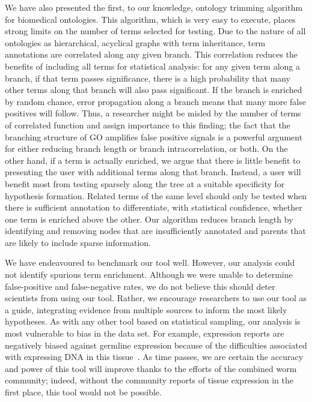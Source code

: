 \documentclass{bmcart}
\begin{document}
We have also presented the first, to our knowledge, ontology trimming algorithm for biomedical ontologies. This algorithm, which is very easy to execute, places strong limits on the number of terms selected for testing. Due to the nature of all ontologies as hierarchical, acyclical graphs with term inheritance, term annotations are correlated along any given branch. This correlation reduces the benefits of including all terms for statistical analysis: for any given term along a branch, if that term passes significance, there is a high probability that many other terms along that branch will also pass significant. If the branch is enriched by random chance, error propagation along a branch means that many more false positives will follow. Thus, a researcher might be misled by the number of terms of correlated function and assign importance to this finding; the fact that the branching structure of GO amplifies false positive signals is a powerful argument for either reducing branch length or branch intracorrelation, or both. On the other hand, if a term is actually enriched, we argue that there is little benefit to presenting the user with additional terms along that branch. Instead, a user will benefit most from testing sparsely along the tree at a suitable specificity for hypothesis formation. Related terms of the same level should only be tested when there is sufficient annotation to differentiate, with statistical confidence, whether one term is enriched above the other. Our algorithm reduces branch length by identifying and removing nodes that are insufficiently annotated and parents that are likely to include sparse information.


We have endeavoured to benchmark our tool well. However, our analysis could not identify %
 spurious term enrichment.
 Although we were unable to determine false-positive and false-negative rates, we do not believe this should deter scientists from using our tool. Rather, we encourage researchers to use our tool as a guide, integrating evidence from multiple sources to inform the most likely hypotheses. As with any other tool based on statistical sampling, our analysis is most vulnerable to bias in the data set. For example, expression reports are negatively biased against germline expression because of the difficulties associated with expressing DNA in this tissue~\cite{Kelly1997}. As time passes, we are certain the accuracy and power of this tool will improve thanks to the efforts of the combined worm community; indeed, without the community reports of tissue expression in the first place, this tool would not be possible.
\end{document}
